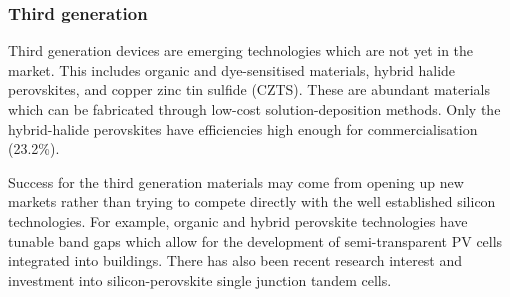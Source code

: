 \subsubsection{Third generation}

Third generation devices are emerging technologies which are not yet in the market. This includes organic and dye-sensitised materials, hybrid halide perovskites, and copper zinc tin sulfide (CZTS). These are abundant materials which can be fabricated through low-cost solution-deposition methods. Only the hybrid-halide perovskites have efficiencies high enough for commercialisation (23.2\%).

Success for the third generation materials may come from opening up new markets rather than trying to compete directly with the well established silicon technologies. For example, organic and hybrid perovskite technologies have tunable band gaps which allow for the development of semi-transparent PV cells integrated into buildings.
There has also been recent research interest and investment into silicon-perovskite single junction tandem cells.








